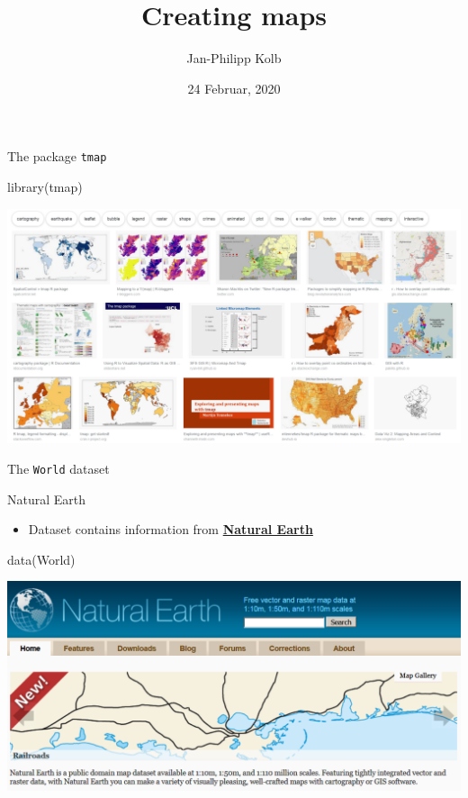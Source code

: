 \documentclass[
  10pt,
  ignorenonframetext,
]{beamer}
\title{Creating maps}
\author{Jan-Philipp Kolb}
\date{24 Februar, 2020}
\newenvironment{Shaded}{\begin{snugshade}}{\end{snugshade}}
\newcommand{\KeywordTok}[1]{\textcolor[rgb]{0.94,0.87,0.69}{#1}}
\newcommand{\NormalTok}[1]{\textcolor[rgb]{0.80,0.80,0.80}{#1}}
\providecommand{\tightlist}{%
  \setlength{\itemsep}{0pt}\setlength{\parskip}{0pt}}
\begin{document}
\frame{\titlepage}

\begin{frame}[fragile]{The package \texttt{tmap}}
\protect\hypertarget{the-package-tmap}{}

\begin{Shaded}
\begin{Highlighting}[]
\KeywordTok{library}\NormalTok{(tmap)}
\end{Highlighting}
\end{Shaded}

\includegraphics{figure/rpackage_tmap.PNG}

\end{frame}

\begin{frame}[fragile]{The \texttt{World} dataset}
\protect\hypertarget{the-world-dataset}{}

\begin{block}{Natural Earth}

\begin{itemize}
\tightlist
\item
  Dataset contains information from
  \href{http://www.naturalearthdata.com/}{\textbf{Natural Earth}}
\end{itemize}

\begin{Shaded}
\begin{Highlighting}[]
\KeywordTok{data}\NormalTok{(World)}
\end{Highlighting}
\end{Shaded}

\includegraphics{figure/NaturalEarthData.PNG}

\end{block}

\end{frame}
\end{document}
